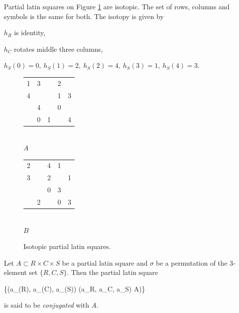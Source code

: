 \begin{exmp}
Partial latin squares on Figure \ref{fig:isotopic-pls} are isotopic. The set of rows, columns and symbols is the same for both. The isotopy is given by
\begin{cosyitemize}
	\item $h_R$ is identity,
	\item $h_C$ rotates middle three columns,
	\item $h_S(0) = 0,\ h_S(1) = 2,\ h_S(2) = 4,\ h_S(3) = 1,\ h_S(4) = 3$.
\end{cosyitemize}%

\begin{figure}[htb]
	\centering
	\begin{minipage}{.30\linewidth}
		\begin{center}
		\begin{tabular}{| c c c c c |}
			\hline
1 & 3 &   & 2 &   \\
4 &   &   & 1 & 3 \\
  & 4 &   & 0 &   \\
  & 0 & 1 &   & 4 \\
			\hline
		\end{tabular} \\
		\bigskip
		$A$
		\end{center}
	\end{minipage}
	\begin{minipage}{.30\linewidth}
		\begin{center}
		\begin{tabular}{| c c c c c |}
			\hline
2 &   & 4 & 1 &   \\
3 &   & 2 &   & 1 \\
  &   & 0 & 3 &   \\
  & 2 &   & 0 & 3 \\
			\hline
		\end{tabular} \\
		\bigskip
		$B$
		\end{center}
	\end{minipage}
	\caption{Isotopic partial latin squares.}
	\label{fig:isotopic-pls}
\end{figure}

\end{exmp}%

\begin{defn}
Let $A \subset R \times C \times S$ be a partial latin square and $\sigma$ be a permutation of the 3-element set $\{R,C,S\}$. Then the partial latin square
\begin{cosyeqnarray}
	\{(a_{\sigma(R)}, a_{\sigma(C)}, a_{\sigma(S)}) \mid (a_R, a_C, a_S) \in A)\}
\end{cosyeqnarray}
is said to be \emph{conjugated} with $A$.
\end{defn}

